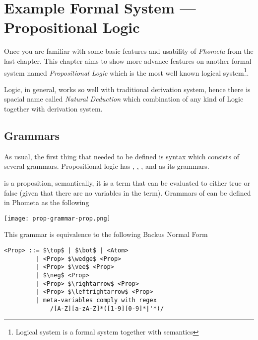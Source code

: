\documentclass[master.tex]{subfiles}
\begin{document}
\chapter{Example Formal System --- Propositional Logic}
\label{chap:example_propositional_logic}

Once you are familiar with some basic features and usability of \emph{Phometa}
from the last chapter. This chapter aims to show more advance features on
another formal system named \emph{Propositional Logic} which is the most well
known logical system\footnote{Logical system is a formal system together with
  semantics\supercite{formal-system-wiki}}.

Logic, in general, works so well with traditional derivation system, hence there
is spacial name called \emph{Natural Deduction} which combination of any kind of
Logic together with derivation system.

\section{Grammars}

As usual, the first thing that needed to be defined is syntax which consists of
several grammars. Propositional logic has , ,
, and  as its grammars.

 is a proposition, semantically, it is a term that can be evaluated
to either true or false (given that there are no variables in the term).
Grammars of  can be defined in Phometa as the following

\centerline{\texttt{[image: prop-grammar-prop.png]}}

This grammar is equivalence to the following Backus Normal Form
\begin{lstlisting}[style=bnf]
<Prop> ::= $\top$ | $\bot$ | <Atom>
         | <Prop> $\wedge$ <Prop>
         | <Prop> $\vee$ <Prop>
         | $\neg$ <Prop>
         | <Prop> $\rightarrow$ <Prop>
         | <Prop> $\leftrightarrow$ <Prop>
         | meta-variables comply with regex
             /[A-Z][a-zA-Z]*([1-9][0-9]*|'*)/
\end{lstlisting}

\newcommand{\propTop}[0]{\bat{\pifmt{$\top$}}}
\newcommand{\propBot}[0]{\bat{\pifmt{$\bot$}}}
\newcommand{\propAnd}[0]{\pifmt{$\wedge$}}
\newcommand{\propOr}[0]{\pifmt{$\vee$}}
\newcommand{\propNot}[0]{\pifmt{$\neg$}}
\newcommand{\propImp}[0]{\pifmt{$\rightarrow$}}
\newcommand{\propIff}[0]{\pifmt{$\leftrightarrow$}}
\end{document}
